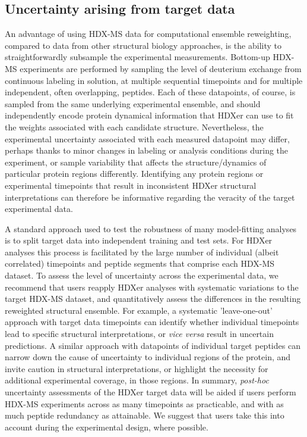 \documentclass[9pt,tutorial]{livecoms}
\begin{document}
\subsection{Uncertainty arising from target data}\label{target_data_uncertainty_sect}
An advantage of using HDX-MS data for computational ensemble reweighting, compared to data from other structural biology approaches, is the ability to straightforwardly subsample the experimental measurements.
Bottom-up HDX-MS experiments are performed by sampling the level of deuterium exchange from continuous labeling in solution, at multiple sequential timepoints and for multiple independent, often overlapping, peptides.
Each of these datapoints, of course, is sampled from the same underlying experimental ensemble, and should independently encode protein dynamical information that HDXer can use to fit the weights associated with each candidate structure.
Nevertheless, the experimental uncertainty associated with each measured datapoint may differ, perhaps thanks to minor changes in labeling or analysis conditions during the experiment, or sample variability that affects the structure/dynamics of particular protein regions differently.
Identifying any protein regions or experimental timepoints that result in inconsistent HDXer structural interpretations can therefore be informative regarding the veracity of the target experimental data.

A standard approach used to test the robustness of many model-fitting analyses is to split target data into independent training and test sets.
For HDXer analyses this process is facilitated by the large number of individual (albeit correlated) timepoints and peptide segments that comprise each HDX-MS dataset.
To assess the level of uncertainty across the experimental data, we recommend that users reapply HDXer analyses with systematic variations to the target HDX-MS dataset, and quantitatively assess the differences in the resulting reweighted structural ensemble. 
For example, a systematic 'leave-one-out' approach with target data timepoints can identify whether individual timepoints lead to specific structural interpretations, or \textit{vice versa} result in uncertain predictions.
A similar approach with datapoints of individual target peptides can narrow down the cause of uncertainty to individual regions of the protein, and invite caution in structural interpretations, or highlight the necessity for additional experimental coverage, in those regions.
In summary, \textit{post-hoc} uncertainty assessments of the HDXer target data will be aided if users perform HDX-MS experiments across as many timepoints as practicable, and with as much peptide redundancy as attainable.
We suggest that users take this into account during the experimental design, where possible.
\end{document}
